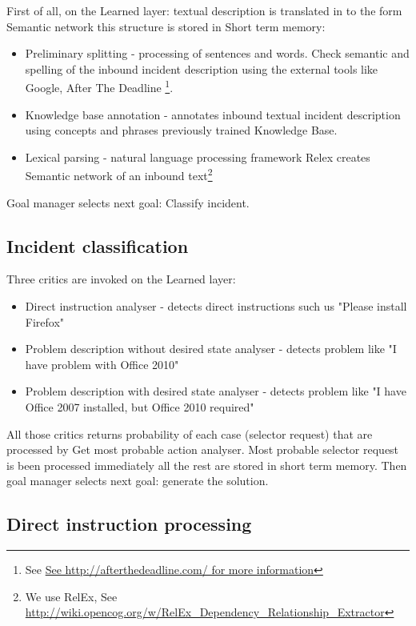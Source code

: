 \documentclass[conference]{IEEEtran}
\begin{document}
First of all, on the Learned layer: textual description is translated in to the form Semantic network this structure is stored in Short term memory:

\begin{itemize}
  \item Preliminary splitting - processing of sentences and words. Check semantic and spelling of the inbound incident description using the external tools like Google, After The Deadline \footnote{See \url{See http://afterthedeadline.com/ for more information}}.
  \item Knowledge base annotation - annotates inbound textual incident description using concepts and phrases previously trained Knowledge Base.
  \item Lexical parsing - natural language processing framework Relex creates Semantic network of an inbound text\footnote{We use RelEx, See \url{http://wiki.opencog.org/w/RelEx_Dependency_Relationship_Extractor}}
\end{itemize}

Goal manager selects next goal: Classify incident.

\subsection{Incident classification}

Three critics are invoked on the Learned layer:
\begin{itemize}
  \item Direct instruction analyser - detects direct instructions such us "Please install Firefox"
  \item Problem description without desired state analyser - detects problem like "I have problem with Office 2010"
  \item Problem description with desired state analyser - detects problem like "I have Office 2007 installed, but Office 2010 required"
\end{itemize}

All those critics returns probability of each case (selector request) that are processed by Get most probable action analyser. Most probable selector request is been processed immediately all the rest are stored in short term memory. Then goal manager selects next goal: generate the solution.

\subsection{Direct instruction processing}
\end{document}
